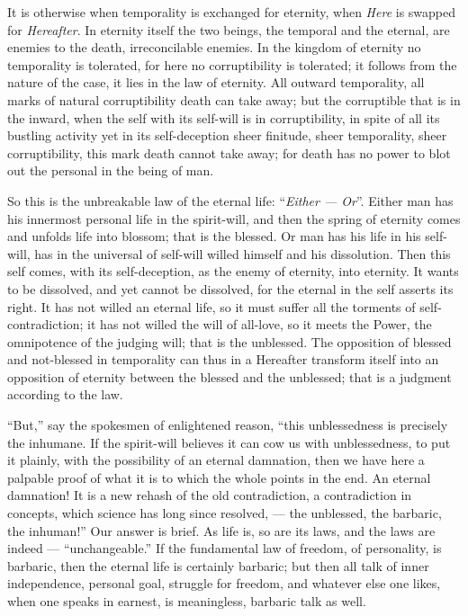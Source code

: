 \documentclass[12pt,a4paper,openany]{book}
\newcommand{\opage}[1]{\marginnote{\footnotesize\textit{[#1]}}}
\begin{document}
It is otherwise when temporality is exchanged for eternity,
when \emph{Here} is swapped for \emph{Hereafter}. In eternity
itself the two beings, the temporal and the eternal, are enemies
\setcounter{footnote}{0}%
\opage{70}to the death, irreconcilable enemies. In the kingdom of eternity
no temporality is tolerated, for here no corruptibility is tolerated;
it follows from the nature of the case, it lies in the law of eternity.
All outward temporality, all marks of natural
corruptibility death can take away; but the corruptible
that is in the inward, when the self with its self-will
is in corruptibility, in spite of all its bustling activity yet
in its self-deception sheer finitude, sheer temporality, sheer
corruptibility, this mark death cannot take away;
for death has no power to blot out the personal in
the being of man.

So this is the unbreakable law of the eternal life:
``\emph{Either --- Or}''. Either man has his innermost
personal life in the spirit-will, and then the spring of eternity
comes and unfolds life into blossom; that is the blessed. Or
man has his life in his self-will, has in the universal of
self-will willed himself and his dissolution. Then
this self comes, with its self-deception, as the enemy of eternity, into
eternity. It wants to be dissolved, and yet cannot be dissolved,
for the eternal in the self asserts its right. It has
not willed an eternal life, so it must suffer all the torments of
self-contradiction; it has not willed the will of all-love,
so it meets the Power, the omnipotence of the judging will; that
is the unblessed. The opposition of blessed and
not-blessed in temporality can thus in a Hereafter transform itself into
an opposition of eternity between the blessed and the unblessed; that is a
judgment according to the law.

``But,'' say the spokesmen of enlightened reason, ``this
unblessedness is precisely the inhumane. If the spirit-will believes it
can cow us with unblessedness, to put it plainly, with the possibility
of an eternal damnation, then we have here a
palpable proof of what it is to which the whole
points in the end. An eternal damnation! It is a new
rehash of the old contradiction, a contradiction in concepts,
which science has long since resolved, --- the unblessed, the
barbaric, the inhuman!'' Our answer is brief. As
life is, so are its laws, and the laws are indeed ---
\setcounter{footnote}{0}%
\opage{71}``unchangeable.'' If the fundamental law of freedom, of personality,
is barbaric, then the eternal life is certainly barbaric;
but then all talk of inner independence, personal
goal, struggle for freedom, and whatever else one likes,
when one speaks in earnest, is meaningless, barbaric talk as well.
\end{document}
